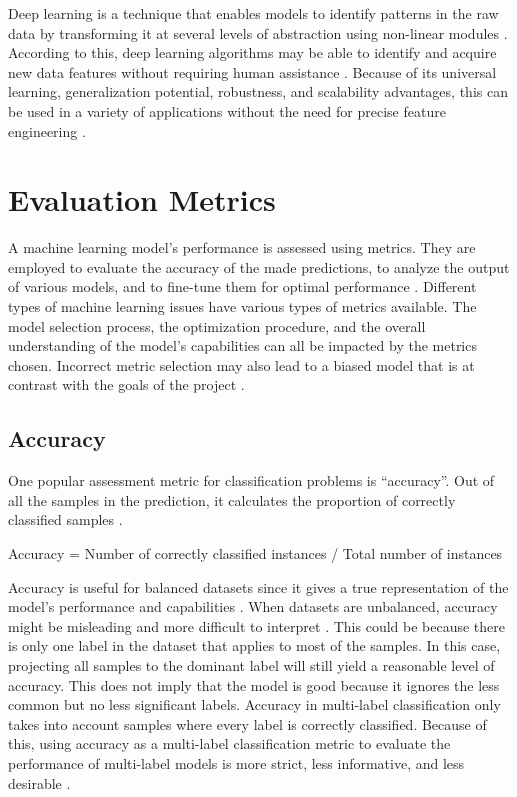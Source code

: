 Deep learning is a technique that enables models to identify patterns in the raw data by transforming it at several levels of abstraction using non-linear modules \citep{helland_tackling_2023}. According to this, deep learning algorithms may be able to identify and acquire new data features without requiring human assistance \citep{helland_tackling_2023}. Because of its universal learning, generalization potential, robustness, and scalability advantages, this can be used in a variety of applications without the need for precise feature engineering \citep{helland_tackling_2023}.

\section{Evaluation Metrics}

A machine learning model's performance is assessed using metrics. They are employed to evaluate the accuracy of the made predictions, to analyze the output of various models, and to fine-tune them for optimal performance \citep{helland_tackling_2023}. Different types of machine learning issues have various types of metrics available. The model selection process, the optimization procedure, and the overall understanding of the model's capabilities can all be impacted by the metrics chosen. Incorrect metric selection may also lead to a biased model that is at contrast with the goals of the project \citep{helland_tackling_2023}.

\subsection{Accuracy}

One popular assessment metric for classification problems is “accuracy”. Out of all the samples in the prediction, it calculates the proportion of correctly classified samples \citep{helland_tackling_2023}. 

Accuracy = Number of correctly classified instances / Total number of instances

Accuracy is useful for balanced datasets since it gives a true representation of the model's performance and capabilities \citep{helland_tackling_2023}. When datasets are unbalanced, accuracy might be misleading and more difficult to interpret \citep{helland_tackling_2023}. This could be because there is only one label in the dataset that applies to most of the samples. In this case, projecting all samples to the dominant label will still yield a reasonable level of accuracy. This does not imply that the model is good because it ignores the less common but no less significant labels. Accuracy in multi-label classification only takes into account samples where every label is correctly classified. Because of this, using accuracy as a multi-label classification metric to evaluate the performance of multi-label models is more strict, less informative, and less desirable \citep{helland_tackling_2023}.